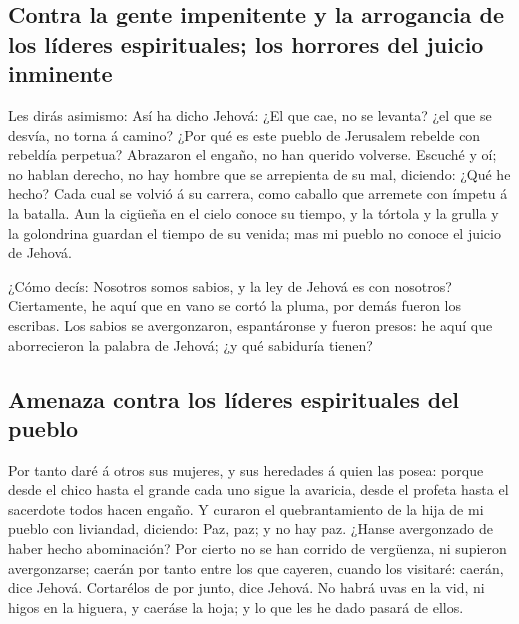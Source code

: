 \hypertarget{contra-la-gente-impenitente-y-la-arrogancia-de-los-luxedderes-espirituales-los-horrores-del-juicio-inminente}{%
\subsection{Contra la gente impenitente y la arrogancia de los líderes
espirituales; los horrores del juicio
inminente}\label{contra-la-gente-impenitente-y-la-arrogancia-de-los-luxedderes-espirituales-los-horrores-del-juicio-inminente}}

 Les dirás asimismo: Así ha dicho Jehová: ¿El que cae, no se
levanta? ¿el que se desvía, no torna á camino?  ¿Por qué es
este pueblo de Jerusalem rebelde con rebeldía perpetua? Abrazaron el
engaño, no han querido volverse.  Escuché y oí; no hablan
derecho, no hay hombre que se arrepienta de su mal, diciendo: ¿Qué he
hecho? Cada cual se volvió á su carrera, como caballo que arremete con
ímpetu á la batalla.  Aun la cigüeña en el cielo conoce su
tiempo, y la tórtola y la grulla y la golondrina guardan el tiempo de su
venida; mas mi pueblo no conoce el juicio de Jehová.

 ¿Cómo decís: Nosotros somos sabios, y la ley de Jehová es
con nosotros? Ciertamente, he aquí que en vano se cortó la pluma, por
demás fueron los escribas.  Los sabios se avergonzaron,
espantáronse y fueron presos: he aquí que aborrecieron la palabra de
Jehová; ¿y qué sabiduría tienen?

\hypertarget{amenaza-contra-los-luxedderes-espirituales-del-pueblo}{%
\subsection{Amenaza contra los líderes espirituales del
pueblo}\label{amenaza-contra-los-luxedderes-espirituales-del-pueblo}}

 Por tanto daré á otros sus mujeres, y sus heredades á
quien las posea: porque desde el chico hasta el grande cada uno sigue la
avaricia, desde el profeta hasta el sacerdote todos hacen engaño.
 Y curaron el quebrantamiento de la hija de mi pueblo con
liviandad, diciendo: Paz, paz; y no hay paz.  ¿Hanse
avergonzado de haber hecho abominación? Por cierto no se han corrido de
vergüenza, ni supieron avergonzarse; caerán por tanto entre los que
cayeren, cuando los visitaré: caerán, dice Jehová. 
Cortarélos de por junto, dice Jehová. No habrá uvas en la vid, ni higos
en la higuera, y caeráse la hoja; y lo que les he dado pasará de ellos.

